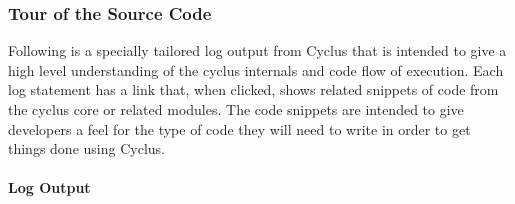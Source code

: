 \documentclass[letterpaper,10pt,english]{sphinxmanual}
\begin{document}
\subsubsection{Tour of the Source Code}
\label{devdoc/code_tour:code-tour-home}\label{devdoc/code_tour::doc}\label{devdoc/code_tour:tour-of-the-source-code}
Following is a specially tailored log output from Cyclus that is intended to
give a high level understanding of the cyclus internals and code flow of
execution.  Each log statement has a link that, when clicked, shows related
snippets of code from the cyclus core or related modules.  The code snippets
are intended to give developers a feel for the type of code they will need to
write in order to get things done using Cyclus.


\paragraph{Log Output}
\end{document}
